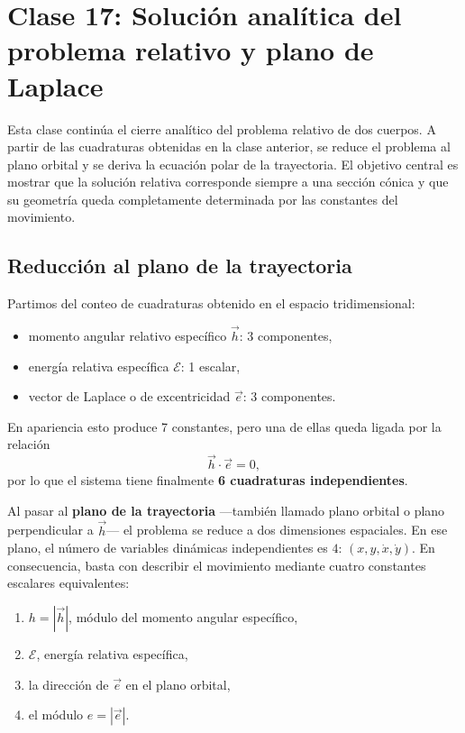 \chapter{Clase 17: Solución analítica del problema relativo y plano de Laplace}

Esta clase continúa el cierre analítico del problema relativo de dos cuerpos. A partir de las cuadraturas obtenidas en la clase anterior, se reduce el problema al plano orbital y se deriva la ecuación polar de la trayectoria. El objetivo central es mostrar que la solución relativa corresponde siempre a una sección cónica y que su geometría queda completamente determinada por las constantes del movimiento.

\section{Reducción al plano de la trayectoria}
Partimos del conteo de cuadraturas obtenido en el espacio tridimensional:
\begin{itemize}
    \item momento angular relativo específico \(\vec{h}\): 3 componentes,
    \item energía relativa específica \(\mathcal{E}\): 1 escalar,
    \item vector de Laplace o de excentricidad \(\vec{e}\): 3 componentes.
\end{itemize}

En apariencia esto produce 7 constantes, pero una de ellas queda ligada por la relación
\[
\vec{h} \cdot \vec{e} = 0,
\]
por lo que el sistema tiene finalmente \textbf{6 cuadraturas independientes}.

Al pasar al \textbf{plano de la trayectoria} —también llamado plano orbital o plano perpendicular a \(\vec{h}\)— el problema se reduce a dos dimensiones espaciales. En ese plano, el número de variables dinámicas independientes es \(4\): \((x, y, \dot{x}, \dot{y})\). En consecuencia, basta con describir el movimiento mediante cuatro constantes escalares equivalentes:
\begin{enumerate}
    \item \(h = |\vec{h}|\), módulo del momento angular específico,
    \item \(\mathcal{E}\), energía relativa específica,
    \item la dirección de \(\vec{e}\) en el plano orbital,
    \item el módulo \(e = |\vec{e}|\).
\end{enumerate}

